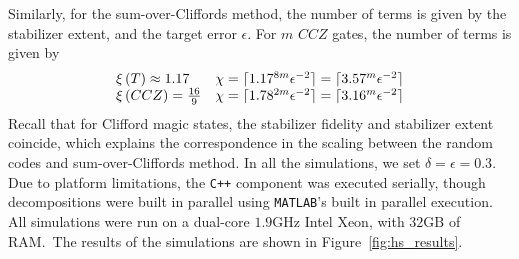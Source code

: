 Similarly, for the sum-over-Cliffords method, the number of terms is given by the stabilizer extent, and the target error $\epsilon$. For $m$ $CCZ$ gates, the number of terms is given by
\begin{equation}
\begin{array}{l r}
\xi\left(T\right) \approx 1.17 & \chi = \lceil 1.17^{8m} \epsilon^{-2}\rceil = \lceil 3.57^{m}\epsilon^{-2}\rceil \\
\xi\left(CCZ\right) = \frac{16}{9} & \chi = \lceil 1.78^{2m}\epsilon^{-2}\rceil = \lceil 3.16^{m}\epsilon^{-2}\rceil
\end{array}
\end{equation}
Recall that for Clifford magic states, the stabilizer fidelity and stabilizer extent coincide, which explains the correspondence in the scaling between the random codes and sum-over-Cliffords method. In all the simulations, we set $\delta=\epsilon=0.3$. Due to platform limitations, the \texttt{C++} component was executed serially, though decompositions were built in parallel using \texttt{MATLAB}'s built in parallel execution. All simulations were run on a dual-core $1.9\mathrm{GHz}$ Intel Xeon, with $32\mathrm{GB}$ of RAM.\ The results of the simulations are shown in Figure~\ref{fig:hs_results}.
